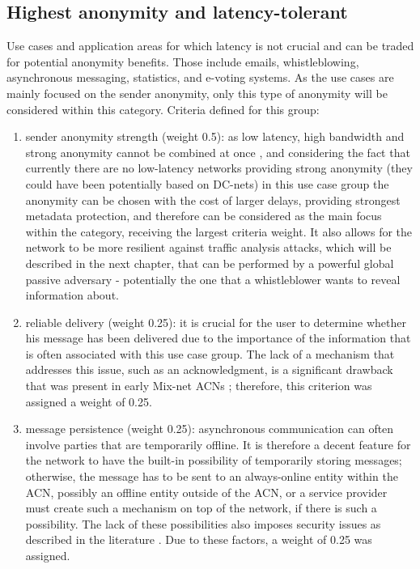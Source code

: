 \subsection{Highest anonymity and latency-tolerant}
Use cases and application areas for which latency is not crucial and can be traded for potential anonymity benefits. Those include emails, whistleblowing, asynchronous messaging, statistics, and e-voting systems.
As the use cases are mainly focused on the sender anonymity, only this type of anonymity will be considered within this category.
Criteria defined for this group:
\begin{enumerate}
    \item  sender anonymity strength (weight 0.5): as low latency, high bandwidth and strong anonymity cannot be combined at once \cite{anonymity-trillema}, and considering the fact that currently there are no low-latency networks providing strong anonymity (they could have been potentially based on DC-nets) in this use case group the anonymity can be chosen with the cost of larger delays, providing strongest metadata protection, and therefore can be considered as the main focus within the category, receiving the largest criteria weight. It also allows for the network to be more resilient against traffic analysis attacks, which will be described in the next chapter, that can be performed by a powerful global passive adversary - potentially the one that a whistleblower wants to reveal information about.
    \item reliable delivery (weight 0.25): it is crucial for the user to determine whether his message has been delivered due to the importance of the information that is often associated with this use case group. The lack of a mechanism that addresses this issue, such as an acknowledgment, is a significant drawback that was present in early Mix-net ACNs \cite{mix-net-reliability}; therefore, this criterion was assigned a weight of 0.25.
    \item message persistence (weight 0.25): asynchronous communication can often involve parties that are temporarily offline. It is therefore a decent feature for the network to have the built-in possibility of temporarily storing messages; otherwise, the message has to be sent to an always-online entity within the ACN, possibly an offline entity outside of the ACN, or a service provider must create such a mechanism on top of the network, if there is such a possibility. The lack of these possibilities also imposes security issues as described in the literature \cite{two-cents-post-office}. Due to these factors, a weight of 0.25 was assigned.
\end{enumerate}

